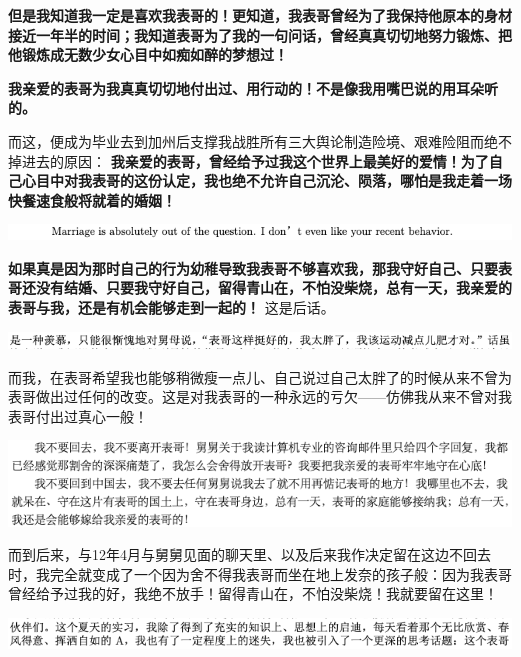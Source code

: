 \documentclass[9pt, b5paper]{article}
\begin{document}
\textbf{但是我知道我一定是喜欢我表哥的！更知道，我表哥曾经为了我保持他原本的身材接近一年半的时间；我知道表哥为了我的一句问话，曾经真真切切地努力锻炼、把他锻炼成无数少女心目中如痴如醉的梦想过！}

\textbf{我亲爱的表哥为我真真切切地付出过、用行动的！不是像我用嘴巴说的用耳朵听的。}

而这，便成为毕业去到加州后支撑我战胜所有三大舆论制造险境、艰难险阻而绝不掉进去的原因：
\textbf{我亲爱的表哥，曾经给予过我这个世界上最美好的爱情！为了自己心目中对我表哥的这份认定，我也绝不允许自己沉沦、陨落，哪怕是我走着一场快餐速食般将就着的婚姻！}

\begin{center}
\includegraphics[width=.9\linewidth]{./pic/backups_plans_20210426_165635.png}
\end{center}

\textbf{如果真是因为那时自己的行为幼稚导致我表哥不够喜欢我，那我守好自己、只要表哥还没有结婚、只要我守好自己，留得青山在，不怕没柴烧，总有一天，我亲爱的表哥与我，还是有机会能够走到一起的！} 这是后话。

\begin{center}
\includegraphics[width=.9\linewidth]{./pic/backups_plans_20210426_163905.png}
\end{center}

而我，在表哥希望我也能够稍微瘦一点儿、自己说过自己太胖了的时候从来不曾为表哥做出过任何的改变。这是对我表哥的一种永远的亏欠——仿佛我从来不曾对我表哥付出过真心一般！

\begin{center}
\includegraphics[width=.9\linewidth]{./pic/backups_plans_20210426_164137.png}
\end{center}

而到后来，与12年4月与舅舅见面的聊天里、以及后来我作决定留在这边不回去时，我完全就变成了一个因为舍不得我表哥而坐在地上发奈的孩子般：因为我表哥曾经给予过我的好，我绝不放手！留得青山在，不怕没柴烧！我就要留在这里！

\begin{center}
\includegraphics[width=.9\linewidth]{./pic/backups_plans_20210426_113411.png}
\end{center}
\end{document}
